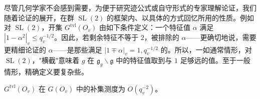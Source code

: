 尽管几何学家不会感到需要，为便于研究迹公式或自守形式的专家理解论证，我们随着论证的展开，在群 $\operatorname{SL}(2)$ 的框架内、以具体的方式回忆所用的性质。例如对 $\operatorname{SL}(2)$，开集 $G^{\mathrm{tvl}}(O_v)$ 由如下条件定义：一个特征值 $\alpha$ 满足 $|1-\alpha^2|_v\le q_v^{-1/2}$。因此，若剩余特征不等于 $2$，被排除的 $\alpha$——更确切地说，需要更精细论证的 $\alpha$——是那些满足 $|1\mp\alpha|_v=1,q_v^{-1/2}$ 的。所以，一如通常情形，对 $\operatorname{SL}(2)$，"横截"意味着 $g$ 在 $\mathfrak g_g\backslash\mathfrak g$ 中的特征值取到与 $1$ 足够远的值。至于一般情形，精确定义要复杂些。

\begin{lemma}
\setcounter{theorem}{7}
$G^{\mathrm{tvl}}(O_v)$ 在 $G(O_v)$ 中的补集测度为 $O(q_v^{-2})$。
\end{lemma}

